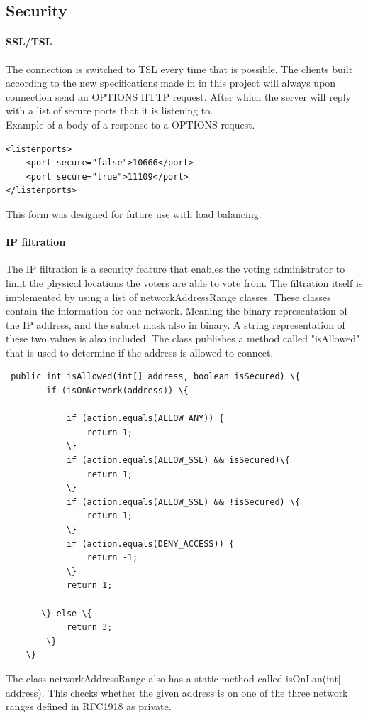 \documentclass[11pt,twoside,a4paper]{book}
\begin{document}
\subsection{Security}
\paragraph{SSL/TSL}
The connection is switched to TSL every time that is possible. The clients built according to the new specifications made in in this project will always upon connection send an OPTIONS HTTP request. After which the server will reply with a list of secure ports that it is listening to.\\
Example of a body of a response to a OPTIONS request.
\begin{lstlisting}
<listenports>
	<port secure="false">10666</port>
	<port secure="true">11109</port>
</listenports>
\end{lstlisting}
This form was designed for future use with load balancing.
\paragraph{IP filtration}
The IP filtration is a security feature that enables the voting administrator to limit the physical locations the voters are able to vote from. The filtration itself is implemented by using a list of networkAddressRange classes. These classes contain the information for one network. Meaning the binary representation of the IP address, and the subnet mask also in binary. A string representation of these two values is also included. The class publishes a method called "isAllowed" that is used to determine if the address is allowed to connect.

\begin{lstlisting}
 public int isAllowed(int[] address, boolean isSecured) \{
        if (isOnNetwork(address)) \{

            if (action.equals(ALLOW_ANY)) {
                return 1;
            \}
            if (action.equals(ALLOW_SSL) && isSecured)\{
                return 1;
            \}
            if (action.equals(ALLOW_SSL) && !isSecured) \{
                return 1;
            \}
            if (action.equals(DENY_ACCESS)) {
                return -1;
            \}
            return 1;

       \} else \{
            return 3;
        \}
    \}
\end{lstlisting}
The class networkAddressRange also has a static method called isOnLan(int[] address). This checks whether the given address is on one of the three network ranges defined in RFC1918 as private.
\end{document}
